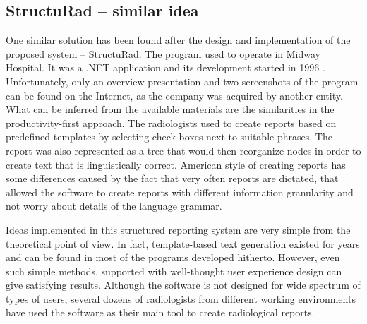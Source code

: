 \documentclass[12pt, twoside, openany]{report}
\theoremstyle{definition}
\begin{document}
\subsection{StructuRad – similar idea} 
One similar solution has been found after the design and implementation of the proposed system – StructuRad. The program used to operate in Midway Hospital. It was a .NET application and its development started in 1996 \cite{structurad}. Unfortunately, only an overview presentation and two screenshots of the program can be found on the Internet, as the company was  acquired by another entity. What can be inferred from the available materials are the similarities in the productivity-first approach. The radiologists used to create reports based on predefined templates by selecting check-boxes next to suitable phrases. The report was also represented as a tree that would then reorganize nodes in order to create text that is linguistically correct. American style of creating reports has some differences caused by the fact that very often reports are dictated, that allowed the software to create reports with different information granularity and not worry about details of the language grammar.

Ideas implemented in this structured reporting system are very simple from the theoretical point of view. In fact, template-based text generation existed for years and can be found in most of the programs developed hitherto. However, even such simple methods, supported with well-thought user experience design can give satisfying results. 
Although the software is not designed for wide spectrum of types of users, several dozens of radiologists from different working environments have used the software as their main tool to create radiological reports. 
\end{document}
